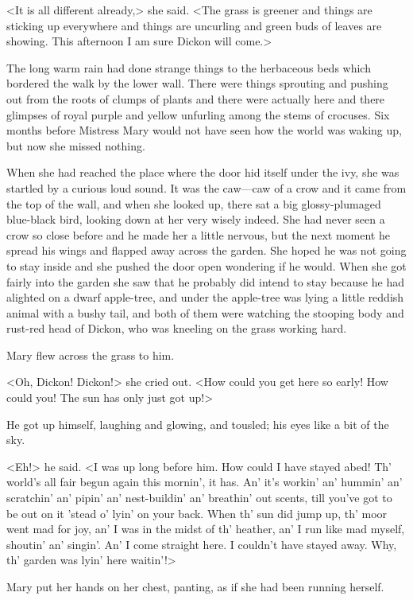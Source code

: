 <It is all different already,> she said. <The grass is greener and things are sticking up everywhere and things are uncurling and green buds of leaves are showing. This afternoon I am sure Dickon will come.>

The long warm rain had done strange things to the herbaceous beds which bordered the walk by the lower wall. There were things sprouting and pushing out from the roots of clumps of plants and there were actually here and there glimpses of royal purple and yellow unfurling among the stems of crocuses. Six months before Mistress Mary would not have seen how the world was waking up, but now she missed nothing.

When she had reached the place where the door hid itself under the ivy, she was startled by a curious loud sound. It was the caw—caw of a crow and it came from the top of the wall, and when she looked up, there sat a big glossy-plumaged blue-black bird, looking down at her very wisely indeed. She had never seen a crow so close before and he made her a little nervous, but the next moment he spread his wings and flapped away across the garden. She hoped he was not going to stay inside and she pushed the door open wondering if he would. When she got fairly into the garden she saw that he probably did intend to stay because he had alighted on a dwarf apple-tree, and under the apple-tree was lying a little reddish animal with a bushy tail, and both of them were watching the stooping body and rust-red head of Dickon, who was kneeling on the grass working hard.

Mary flew across the grass to him.

<Oh, Dickon! Dickon!> she cried out. <How could you get here so early! How could you! The sun has only just got up!>

He got up himself, laughing and glowing, and tousled; his eyes like a bit of the sky.

<Eh!> he said. <I was up long before him. How could I have stayed abed! Th' world's all fair begun again this mornin', it has. An' it's workin' an' hummin' an' scratchin' an' pipin' an' nest-buildin' an' breathin' out scents, till you've got to be out on it 'stead o' lyin' on your back. When th' sun did jump up, th' moor went mad for joy, an' I was in the midst of th' heather, an' I run like mad myself, shoutin' an' singin'. An' I come straight here. I couldn't have stayed away. Why, th' garden was lyin' here waitin'!>

Mary put her hands on her chest, panting, as if she had been running herself.

